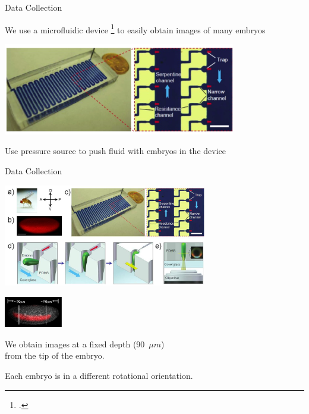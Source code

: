 \documentclass[10pt,aspectratio=169]{beamer}
\begin{document}
\begin{frame}{Data Collection}

\begin{center}
We use a microfluidic device \footcite{chung2010microfluidic} to easily obtain images of many embryos

\includegraphics[width=4in]{drosophila_imaging_setup_close}

Use pressure source to push fluid with embryos in the device

\end{center}

\end{frame}

\begin{frame}{Data Collection}

\begin{center}
\includegraphics[width=3.5in]{drosophila_imaging_setup}

\vspace{0.2in}

\begin{minipage}[b]{1.1in}
\includegraphics[width=1in]{imaging_depth}
\end{minipage}
%
\begin{minipage}[b]{0.65\textwidth}
We obtain images at a fixed depth (90~$\mu m$) \\from the tip of the embryo.

Each embryo is in a different rotational orientation.
\end{minipage}

\end{center}

\end{frame}
\end{document}
